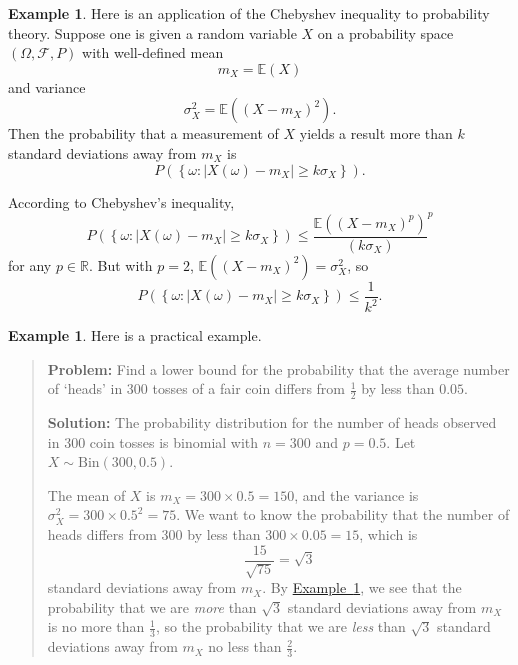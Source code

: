 \documentclass[a4paper,12pt]{scrreprt}
\newcommand{\R}{\mathbb{R}}
\theoremstyle{definition}
\newtheorem{example}[definition]{Example}
\theoremstyle{plain}
\theoremstyle{remark}
\begin{document}
\begin{example}
  \label{eg:chebyshevinequalityandprobability}
  Here is an application of the Chebyshev inequality to probability theory. Suppose one is given a random variable $X$ on a probability space $(\Omega, \mathcal{F}, P)$ with well-defined mean
  \begin{equation*}
    m_{X} = \mathbb{E}(X)
  \end{equation*}
  and variance
  \begin{equation*}
    \sigma_{X}^{2} = \mathbb{E}\left( {(X - m_{X})}^{2} \right).
  \end{equation*}
  Then the probability that a measurement of $X$ yields a result more than $k$ standard deviations away from $m_{X}$ is
  \begin{equation*}
    P(\left\{ \omega\colon \left| X(\omega) - m_{X} \right| \geq k\sigma_{X} \right\}).
  \end{equation*}

  According to Chebyshev's inequality,
  \begin{equation*}
    P(\left\{ \omega\colon \left| X(\omega) - m_{X} \right| \geq k\sigma_{X} \right\}) \leq  \frac{\mathbb{E}({(X - m_{X})}^{p})}{(k\sigma_{X})}^{p}
  \end{equation*}
  for any $p \in \R$. But with $p = 2$, $\mathbb{E}({(X - m_{X})}^{2}) = \sigma_{X}^{2}$, so
  \begin{equation*}
    P(\left\{ \omega\colon \left| X(\omega) - m_{X} \right| \geq k\sigma_{X} \right\}) \leq \frac{1}{k^{2}}.
  \end{equation*}
\end{example}

\begin{example}
  Here is a practical example.
  \begin{quote}
    \textbf{Problem:} Find a lower bound for the probability that the average number of `heads' in 300 tosses of a fair coin differs from $\frac{1}{2}$ by less than $0.05$.

    \textbf{Solution:} The probability distribution for the number of heads observed in 300 coin tosses is binomial with $n = 300$ and $p = 0.5$. Let $X \sim \mathrm{Bin}(300, 0.5)$.

    The mean of $X$ is $m_{X} = 300 \times 0.5 = 150$, and the variance is $\sigma_{X}^{2} = 300\times 0.5^{2} = 75$. We want to know the probability that the number of heads differs from 300 by less than $300 \times 0.05 = 15$, which is
    \begin{equation*}
      \frac{15}{\sqrt{75}} = \sqrt{3}
    \end{equation*}
    standard deviations away from $m_{X}$. By \hyperref[eg:chebyshevinequalityandprobability]{Example~\ref*{eg:chebyshevinequalityandprobability}}, we see that the probability that we are \emph{more} than $\sqrt{3}$ standard deviations away from $m_{X}$ is no more than $\frac{1}{3}$, so the probability that we are \emph{less} than $\sqrt{3}$ standard deviations away from $m_{X}$ no less than $\frac{2}{3}$.
  \end{quote}
\end{example}
\end{document}
